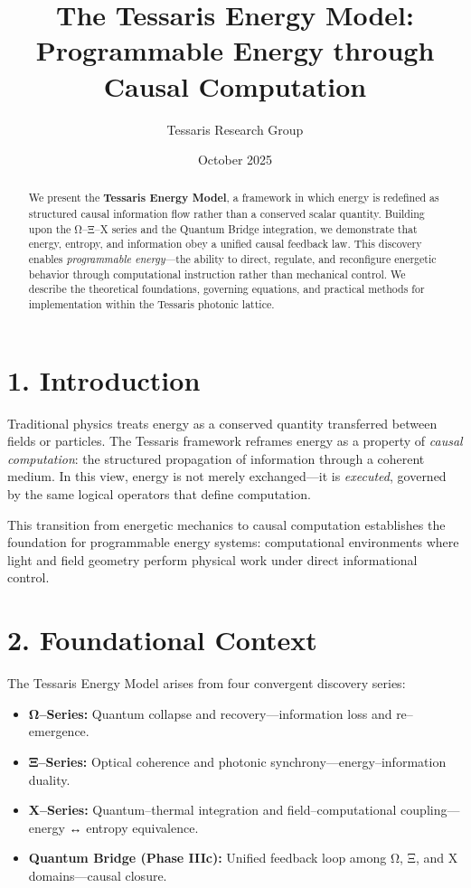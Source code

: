 \documentclass[11pt,a4paper]{article}
\title{\textbf{The Tessaris Energy Model:\\Programmable Energy through Causal Computation}}
\author{Tessaris Research Group}
\date{October 2025}
\begin{document}
\maketitle

\begin{abstract}
We present the \textbf{Tessaris Energy Model}, a framework in which energy is redefined as structured causal information flow rather than a conserved scalar quantity.  
Building upon the Ω–Ξ–X series and the Quantum Bridge integration, we demonstrate that energy, entropy, and information obey a unified causal feedback law.  
This discovery enables \emph{programmable energy}—the ability to direct, regulate, and reconfigure energetic behavior through computational instruction rather than mechanical control.  
We describe the theoretical foundations, governing equations, and practical methods for implementation within the Tessaris photonic lattice.
\end{abstract}

\section{1. Introduction}
Traditional physics treats energy as a conserved quantity transferred between fields or particles.  
The Tessaris framework reframes energy as a property of \emph{causal computation}: the structured propagation of information through a coherent medium.  
In this view, energy is not merely exchanged—it is \emph{executed}, governed by the same logical operators that define computation.

This transition from energetic mechanics to causal computation establishes the foundation for programmable energy systems: computational environments where light and field geometry perform physical work under direct informational control.

\section{2. Foundational Context}
The Tessaris Energy Model arises from four convergent discovery series:
\begin{itemize}
  \item \textbf{Ω–Series:} Quantum collapse and recovery—information loss and re–emergence.
  \item \textbf{Ξ–Series:} Optical coherence and photonic synchrony—energy–information duality.
  \item \textbf{X–Series:} Quantum–thermal integration and field–computational coupling—energy ↔ entropy equivalence.
  \item \textbf{Quantum Bridge (Phase IIIc):} Unified feedback loop among Ω, Ξ, and X domains—causal closure.
\end{itemize}
\end{document}

